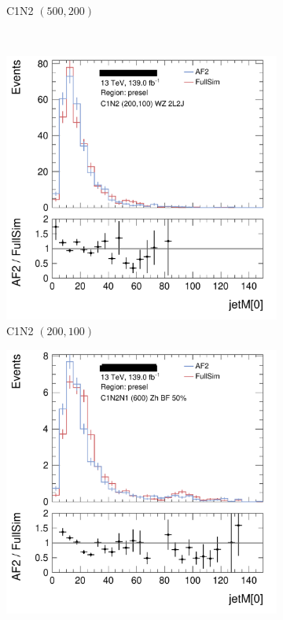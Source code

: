 \begin{figure}[tp]
\begin{subfigure}{0.48\textwidth}
\caption{C1N2 $(500, 200)$}
\end{subfigure}
\\
\centering
\begin{subfigure}{0.48\textwidth}
\includegraphics[width=\textwidth]{figures/2ljets_C1N2_WZ_200p0_100p0_2L2J_presel_jetM[0]_50.png}
\caption{C1N2 $(200, 100)$}
\end{subfigure}
\hfill
\begin{subfigure}{0.48\textwidth}
\centering
\includegraphics[width=\textwidth]{figures/2ljets_C1N2N1_GGMHinoZh50_600_BF50_presel_jetM[0]_62.png}

\end{subfigure}
\end{figure}
